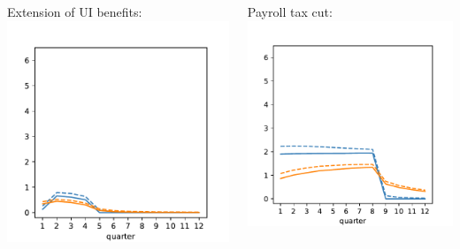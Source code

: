 \documentclass[pdflatex,aspectratio=169]{beamer}
\begin{document}
{\begin{frame}
\begin{columns}
                \begin{column}{0.50\textwidth}  	
                  Extension of UI benefits:
                  \includegraphics[width=1.2\linewidth]{Code/HA-Models/FromPandemicCode/Figures/recession_UI_relrecession} 
                \end{column}
                
                \begin{column}{0.50\textwidth}  
                  Payroll tax cut:	
                  \includegraphics[width=1.2\linewidth]{Code/HA-Models/FromPandemicCode/Figures/recession_taxcut_relrecession}
                \end{column}
              \end{columns}
              

\end{frame}}
\end{document}
